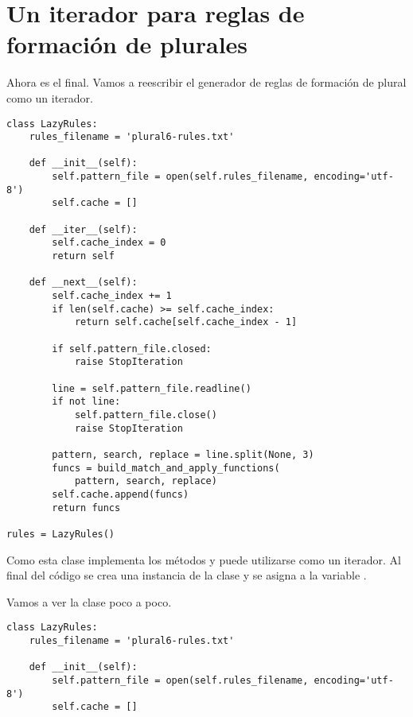 \section{Un iterador para reglas de formación de plurales}

Ahora es el final. Vamos a reescribir el generador de reglas de formación de plural como un iterador.


\noindent\begin{minipage}{\textwidth}
\begin{lstlisting}[mathescape=True]
class LazyRules:
    rules_filename = 'plural6-rules.txt'

    def __init__(self):
        self.pattern_file = open(self.rules_filename, encoding='utf-8')
        self.cache = []

    def __iter__(self):
        self.cache_index = 0
        return self

    def __next__(self):
        self.cache_index += 1
        if len(self.cache) >= self.cache_index:
            return self.cache[self.cache_index - 1]

        if self.pattern_file.closed:
            raise StopIteration

        line = self.pattern_file.readline()
        if not line:
            self.pattern_file.close()
            raise StopIteration

        pattern, search, replace = line.split(None, 3)
        funcs = build_match_and_apply_functions(
            pattern, search, replace)
        self.cache.append(funcs)
        return funcs

rules = LazyRules()
\end{lstlisting}
\end{minipage}

Como esta clase implementa los métodos  y  puede utilizarse como un iterador. Al final del código se crea una instancia de la clase y se asigna a la variable .

Vamos a ver la clase poco a poco.

\noindent\begin{minipage}{\textwidth}
\begin{lstlisting}[mathescape=True]
class LazyRules:
    rules_filename = 'plural6-rules.txt'

    def __init__(self):
        self.pattern_file = open(self.rules_filename, encoding='utf-8')
        self.cache = []
\end{lstlisting}
\end{minipage}

